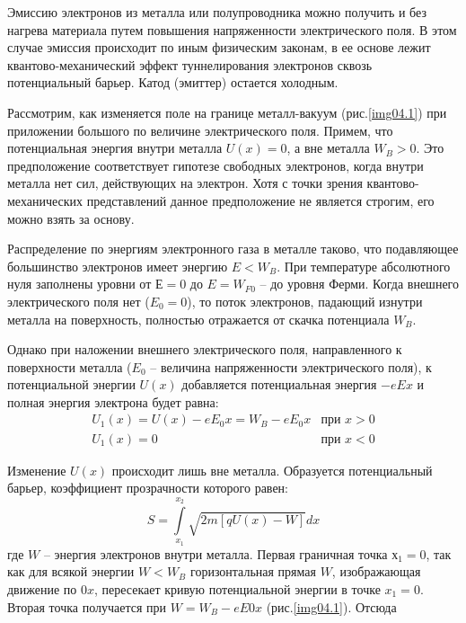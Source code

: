 
Эмиссию электронов из металла или полупроводника можно получить и без нагрева 
материала путем повышения напряженности электрического поля. В этом случае 
эмиссия происходит по иным физическим законам, в ее основе лежит 
квантово-механический эффект туннелирования электронов сквозь потенциальный 
барьер. Катод (эмиттер) остается холодным.

Рассмотрим, как изменяется поле на границе металл-вакуум (рис.\ref{img04.1}) 
при приложении большого по величине электрического поля. Примем, что 
потенциальная энергия внутри металла \( U(x) = 0 \), а вне металла 
\( W_B > 0 \). Это предположение соответствует гипотезе свободных электронов, 
когда внутри металла нет сил, действующих на электрон. Хотя с точки зрения 
квантово-механических представлений данное предположение не является строгим, 
его можно взять за основу.

Распределение по энергиям электронного газа в металле таково, что подавляющее 
большинство электронов имеет энергию \( E < W_B \). При температуре 
абсолютного нуля заполнены уровни от \( Е = 0 \) до \( E = W_{F0} \) -- до 
уровня Ферми. Когда внешнего электрического поля нет (\( E_0 = 0 \)), то поток 
электронов, падающий изнутри металла на поверхность, полностью отражается от 
скачка потенциала \( W_B \).

Однако при наложении внешнего электрического поля, направленного к поверхности 
металла (\( E_0 \) -- величина напряженности электрического поля), к 
потенциальной энергии \( U(x) \) добавляется потенциальная энергия \( -eEx \) 
и полная энергия электрона будет равна:
\begin{equation}
	\begin{array}{cr}
		U_1(x) = U(x) - eE_0 x = W_B - eE_0 x & \text{при } x > 0 \\
		U_1(x) = 0 & \text{при } x < 0
	\end{array}
	\label{eq04.1.10}
\end{equation}
 
Изменение \( U(x) \) происходит лишь вне металла. Образуется потенциальный 
барьер, коэффициент прозрачности которого равен:
\begin{equation}
	S = \int\limits_{x_1}^{x_2} \sqrt{2m[qU(x)-W]}dx
	\label{eq04.1.11}
\end{equation}
где \( W \) -- энергия электронов внутри металла. Первая граничная точка 
\( х_1 = 0 \), так как для всякой энергии \( W < W_B \) горизонтальная прямая 
\( W \), изображающая движение по \( 0x \), пересекает кривую потенциальной 
энергии в точке \( x_1 = 0 \). Вторая точка получается при 
\( W = W_B - eE0x \) (рис.\ref{img04.1}). Отсюда

